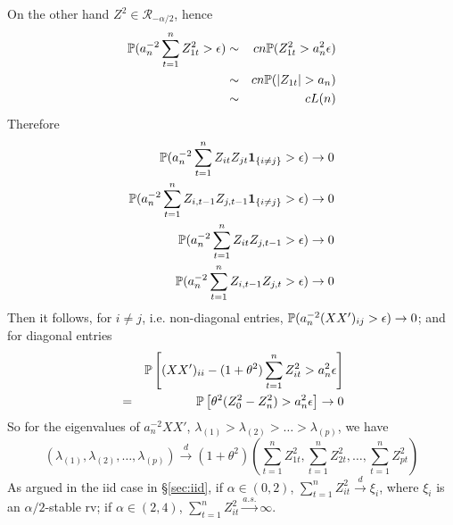\documentclass{article}
\begin{document}
On the other hand $Z^2 \in \mathcal R_{-\alpha/2}$, hence
\begin{eqnarray*}
  \P(a_n^{-2} \sum_{t=1}^n Z_{1t}^2 > \epsilon) &\sim& c n
  \P(Z_{1t}^2 > a_n^2 \epsilon) \\
  &\sim& c n \P(|Z_{1t}| > a_n) \\
  &\sim& c L(n)
\end{eqnarray*}
Therefore
\begin{eqnarray*}
  \P(a_n^{-2} \sum_{t=1}^n Z_{it} Z_{jt}\I{i \neq j} > \epsilon) \to
  0 \\
  \P(a_n^{-2} \sum_{t=1}^n Z_{i,t-1} Z_{j,t-1} \I{i \neq j} >
  \epsilon) \to 0 \\
  \P(a_n^{-2} \sum_{t=1}^n Z_{it} Z_{j,t-1} > \epsilon) \to 0
  \\
  \P(a_n^{-2} \sum_{t=1}^n Z_{i, t-1} Z_{j,t} > \epsilon) \to 0
\end{eqnarray*}
Then it follows, for $i \neq j$, i.e. non-diagonal entries,
$\P(a_n^{-2} (XX')_{ij} > \epsilon) \to 0$; and for diagonal entries
\begin{eqnarray*}
  && \P\left[(XX')_{ii} - (1 + \theta^2)\sum_{t=1}^n
      Z_{it}^2 > a_n^{2} \epsilon \right] \\
  &=& \P\left[\theta^2 ( Z_{0}^2-Z_{n}^2) > a_n^{2} \epsilon
  \right] \to 0\\
\end{eqnarray*}
So for the eigenvalues of $a_n^{-2}XX'$, $\lambda_{(1)} > \lambda_{(2)} >
\dots > \lambda_{(p)}$, we have
\[
(\lambda_{(1)}, \lambda_{(2)}, \dots, \lambda_{(p)}) \xrightarrow{d}
(1+\theta^2)(\sum_{t=1}^n Z_{1t}^2, \sum_{t=1}^n Z_{2t}^2, \dots,
\sum_{t=1}^n Z_{pt}^2)
\]
As argued in the iid case in \S\ref{sec:iid}, if $\alpha \in (0,2)$,
$\sum_{t=1}^n Z_{it}^2 \xrightarrow{d} \xi_{i}$, where $\xi_{i}$ is an
$\alpha/2$-stable rv; if $\alpha \in (2,4)$, $\sum_{t=1}^n Z_{it}^2
\xrightarrow{a.s.} \infty$.
\end{document}
